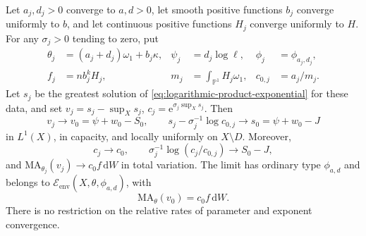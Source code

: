 \begin{theorem}\label{thm:moving-logarithmic-selection}
Let $a_j,d_j>0$ converge to $a,d>0$, let smooth positive functions $b_j$ converge uniformly to $b$, and let continuous positive functions $H_j$ converge uniformly to $H$. For any $\sigma_j>0$ tending to zero, put
\[
 \begin{aligned}
 \theta_j&=(a_j+d_j)\omega_1+b_j\kappa,&\psi_j&=d_j\log\ell,&\phi_j&=\phi_{a_j,d_j},\\
 f_j&=n b_j^kH_j,&m_j&=\int_{\mathbb P^1}H_j\omega_1,&c_{0,j}&=a_j/m_j.
 \end{aligned}
\]
Let $s_j$ be the greatest solution of \eqref{eq:logarithmic-product-exponential} for these data, and set $v_j=s_j-\sup_Xs_j$, $c_j=\mathrm{e}^{\sigma_j\sup_Xs_j}$. Then
\[
 v_j\longrightarrow v_0=\psi+w_0-S_0,\qquad
 s_j-\sigma_j^{-1}\log c_{0,j}\longrightarrow s_0=\psi+w_0-J
\]
in $L^1(X)$, in capacity, and locally uniformly on $X\setminus D$. Moreover,
\begin{equation}\label{eq:logarithmic-scalar-error}
 c_j\longrightarrow c_0,\qquad
 \sigma_j^{-1}\log(c_j/c_{0,j})\longrightarrow S_0-J,
\end{equation}
and $\mathrm{MA}_{\theta_j}(v_j)\to c_0 f\,\mathrm{d}W$ in total variation. The limit has ordinary type $\phi_{a,d}$ and belongs to $\mathcal E_{\mathrm{env}}(X,\theta,\phi_{a,d})$, with
\[
 \mathrm{MA}_\theta(v_0)=c_0 f\,\mathrm{d}W.
\]
There is no restriction on the relative rates of parameter and exponent convergence.
\end{theorem}
